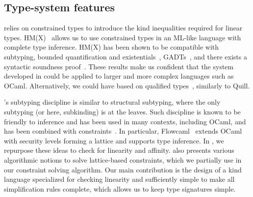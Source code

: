\subsection{Type-system features}
%
\lang relies on constrained types
to introduce the kind inequalities required for linear types.
HM(X)~\citep{DBLP:journals/tapos/OderskySW99} 
allows us to use constrained types in an ML-like language with complete
type inference.
HM(X) has been shown to be compatible with subtyping,
bounded quantification and existentials~\citep{DBLP:conf/icfp/Simonet03},
GADTs~\citep{DBLP:journals/toplas/SimonetP07},
and there exists a syntactic soundness proof~\citep{DBLP:journals/entcs/SkalkaP02}.
These results make us confident that the system developed in \lang
could be applied to larger and more complex languages such as OCaml.
Alternatively, we could have based \lang on qualified
types~\cite{DBLP:journals/scp/Jones94}, similarly to Quill.

\lang's  subtyping discipline is similar
to structural subtyping, where the only subtyping (or here, subkinding)
is at the leaves.
Such discipline is known to be friendly to inference and has been used in many
contexts, including OCaml, and has been combined
with constraints~\citep{DBLP:journals/tapos/OderskySW99,DBLP:conf/sas/TrifonovS96}.
In particular, Flowcaml~\citep{DBLP:conf/popl/PottierS02}
extends OCaml with security levels forming a lattice and supports type inference.
In \lang, we repurpose these ideas to check for linearity and affinity.
\citet{DBLP:conf/aplas/Simonet03} also presents various algorithmic
notions to solve lattice-based constraints, which we partially use
in our constraint solving algorithm. Our main contribution
is the design of a kind language specialized for checking linearity
and sufficiently simple to make
all simplification rules complete, which allows us to keep type signatures simple.


